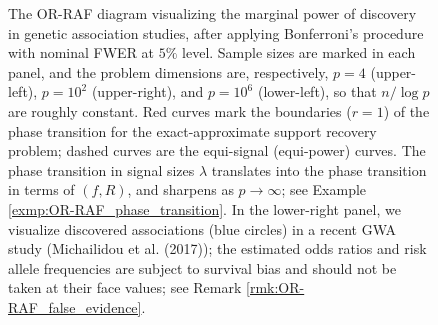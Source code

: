 \begin{figure}
      \caption{The OR-RAF diagram visualizing the marginal power of discovery in genetic association studies, after applying Bonferroni's procedure with nominal FWER at $5\%$ level. Sample sizes are marked in each panel, and the problem dimensions are, respectively, $p=4$ (upper-left), $p=10^2$ (upper-right), and $p=10^6$ (lower-left), so that $n/\log{p}$ are roughly constant. Red curves mark the boundaries ($r=1$) of the phase transition for the exact-approximate support recovery problem; dashed curves are the equi-signal (equi-power) curves. The phase transition in signal sizes $\lambda$ translates into the phase transition in terms of $(f,R)$, and sharpens as $p\to\infty$; see Example \ref{exmp:OR-RAF_phase_transition}. In the lower-right panel, we visualize discovered associations (blue circles) in a recent GWA study (Michailidou et al. (2017)); the estimated odds ratios and risk allele frequencies are subject to survival bias and should not be taken at their face values; see Remark \ref{rmk:OR-RAF_false_evidence}.
      } 
      \label{fig:OR-RAF_GWAS}
\end{figure}


